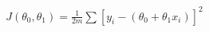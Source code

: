\documentclass[preview]{standalone}
\begin{document}
\begin{align*}
J(\theta_0,\theta_1) = \frac{1}{2m}\sum\left[y_i - \left(\theta_0+\theta_1x_i\right)\right]^2
\end{align*}
\end{document}
